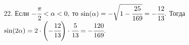22. Если $-\cfrac{\pi}{2}<\alpha<0,$ то  $\sin(\alpha)=-\sqrt{1-\cfrac{25}{169}}=-\cfrac{12}{13}.$ Тогда $\sin(2\alpha)=2\cdot\left(-\cfrac{12}{13}\right)\cdot\cfrac{5}{13}=-\cfrac{120}{169}.$\\
